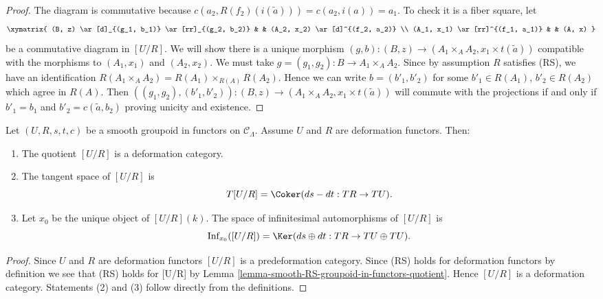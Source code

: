 \begin{proof}
\medskip\noindent
The diagram is commutative because
$c(a_2, R(f_2)(i(\widetilde{a}))) = c(a_2, i(a)) = a_1$.
To check it is a fiber square, let
$$
\xymatrix{
(B, z) \ar[d]_{(g_1, b_1)} \ar[rr]_{(g_2, b_2)} & & (A_2, x_2)
\ar[d]^{(f_2, a_2)} \\
(A_1, x_1) \ar[rr]^{(f_1, a_1)} & & (A, x)
}
$$
be a commutative diagram in $[U/R]$. We will show there is a unique morphism
$(g, b) : (B, z) \to (A_1 \times_A A_2, x_1 \times t(\widetilde{a}))$
compatible with the morphisms to $(A_1, x_1)$ and $(A_2, x_2)$.
We must take $g = (g_1, g_2) : B \to A_1 \times_A A_2$.
Since by assumption $R$ satisfies (RS), we have an identification
$R(A_1 \times_A A_2) = R(A_1) \times_{R(A)} R(A_2)$.
Hence we can write $b = (b'_1, b'_2)$ for some
$b'_1 \in R(A_1)$, $b'_2 \in R(A_2)$ which agree in $R(A)$.
Then
$((g_1, g_2), (b'_1, b'_2)) : (B, z) \to
(A_1 \times_A A_2, x_1 \times t(\widetilde{a}))$
will commute with the projections if and only if
$b'_1 = b_1$ and $b'_2 = c(\widetilde{a}, b_2)$ proving unicity and
existence.
\end{proof}

\begin{lemma}
\label{lemma-deformation-groupoid-quotient}
Let $(U, R, s, t, c)$ be a smooth groupoid in functors on $\mathcal{C}_\Lambda$.
Assume $U$ and $R$ are deformation functors. Then:
\begin{enumerate}
\item The quotient $[U/R]$ is a deformation category.
\item The tangent space of $[U/R]$ is
$$
T[U/R] = \Coker(ds-dt: TR \to TU).
$$
\item Let $x_0$ be the unique object of $[U/R](k)$.  The space of infinitesimal
automorphisms of $[U/R]$ is
$$
\text{Inf}_{x_0}([U/R]) =
\Ker(ds \oplus dt : TR \to TU \oplus TU).
$$
\end{enumerate}
\end{lemma}

\begin{proof}
Since $U$ and $R$ are deformation functors $[U/R]$ is a predeformation
category. Since (RS) holds for deformation functors by
definition we see that (RS) holds for [U/R] by
Lemma \ref{lemma-smooth-RS-groupoid-in-functors-quotient}.
Hence $[U/R]$ is a deformation category. Statements (2) and (3)
follow directly from the definitions.
\end{proof}







